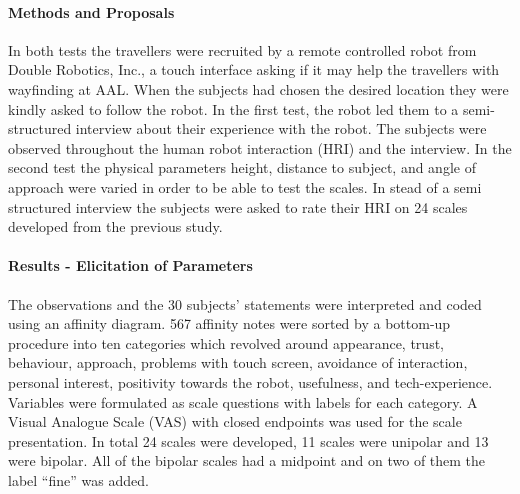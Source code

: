\documentclass[a4paper]{article}
\begin{document}
\paragraph{Methods and Proposals}
%
In both tests the travellers were recruited by a remote controlled robot from Double Robotics, Inc., a touch interface asking if it may help the travellers with wayfinding at AAL. When the subjects had chosen the desired location they were kindly asked to follow the robot. In the first test, the robot led them to a semi-structured interview about their experience with the robot. The subjects were observed throughout the human robot interaction (HRI) and the interview. In the second test the physical parameters height, distance to subject, and angle of approach were varied in order to be able to test the scales.
In stead of a semi structured interview the subjects were asked to rate their HRI on 24 scales developed from the previous study.

\paragraph{Results - Elicitation of Parameters}
The observations and the 30 subjects' statements were interpreted and coded using an affinity diagram. 567 affinity notes were sorted by a bottom-up procedure into ten categories which revolved around appearance, trust, behaviour, approach, problems with touch screen, avoidance of interaction, personal interest, positivity towards the robot, usefulness, and tech-experience. Variables were formulated as scale questions with labels for each category. A Visual Analogue Scale (VAS) with closed endpoints was used for the scale presentation. In total 24 scales were developed, 11 scales were unipolar and 13 were bipolar. All of the bipolar scales had a midpoint and on two of them the label ``fine'' was added.  
\end{document}

